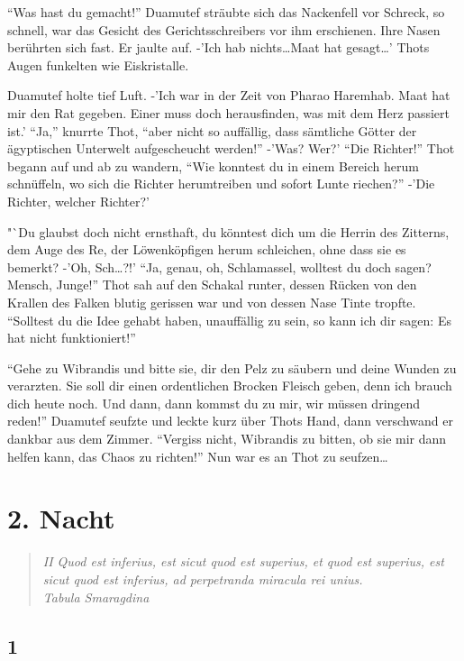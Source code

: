 \documentclass[11pt,titlepage,a5paper]{book}
\begin{document}
 "`Was hast du gemacht!"' Duamutef sträubte sich das Nackenfell vor Schreck, so schnell, war das Gesicht des Gerichtsschreibers vor ihm erschienen. Ihre Nasen berührten sich fast. Er jaulte auf. -'Ich hab nichts\dots Maat hat gesagt\dots' Thots Augen funkelten wie Eiskristalle. 

Duamutef holte tief Luft. -'Ich war in der Zeit von Pharao Haremhab. Maat hat mir den Rat gegeben. Einer muss doch herausfinden, was mit dem Herz passiert ist.' "`Ja,"' knurrte Thot, "`aber nicht so auffällig, dass sämtliche Götter der ägyptischen Unterwelt aufgescheucht werden!"' -'Was? Wer?' "`Die Richter!"' Thot begann auf und ab zu wandern, "`Wie konntest du in einem Bereich herum schnüffeln, wo sich die Richter herumtreiben und sofort Lunte riechen?"' -'Die Richter, welcher Richter?'

 "`Du glaubst doch nicht ernsthaft, du könntest dich um die Herrin des Zitterns, dem Auge des Re, der Löwenköpfigen herum schleichen, ohne dass sie es bemerkt? -'Oh, Sch\dots?!' "`Ja, genau, oh, Schlamassel, wolltest du doch sagen? Mensch, Junge!"' Thot sah auf den Schakal runter, dessen Rücken von den Krallen des Falken blutig gerissen war und von dessen Nase Tinte tropfte. "`Solltest du die Idee gehabt haben, unauffällig zu sein, so kann ich dir sagen: Es hat nicht funktioniert!"'

"`Gehe zu Wibrandis und bitte sie, dir den Pelz zu säubern und deine Wunden zu verarzten. Sie soll dir einen ordentlichen Brocken Fleisch geben, denn ich brauch dich heute noch. Und dann, dann kommst du zu mir, wir müssen dringend reden!"' Duamutef seufzte und leckte kurz über Thots Hand, dann verschwand er dankbar aus dem Zimmer. "`Vergiss nicht, Wibrandis zu bitten, ob sie mir dann helfen kann, das Chaos zu richten!"' Nun war es an Thot zu seufzen\dots

\chapter*{2. Nacht}


\begin{quotation}

\emph{II Quod est inferius, est sicut quod est superius, et quod est superius, est sicut quod est inferius, ad perpetranda miracula rei unius. \\Tabula Smaragdina}

\end{quotation}


\section*{1}
\end{document}
